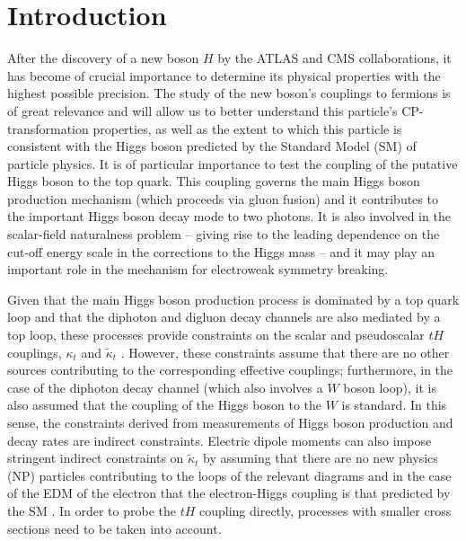 \documentclass[aps,preprint,tightenlines,floatfix,superscriptaddress,nofootinbib,showpacs]{revtex4-1}
\def\kp{\kappa_t}
\def\kpt{\tilde{\kappa}_t}
\begin{document}
\section{Introduction}
\label{sec1}
After the discovery of a new boson $H$ by the ATLAS \cite{atlasH} and
CMS \cite{cmsH} collaborations, it has become of crucial importance
 to determine its physical
 properties with the highest possible precision.
 The study of the new boson's couplings
 to fermions is of great relevance
 and will allow us to better understand this particle's $\mathrm{CP}$-transformation
   properties, as well as the
extent to which this particle is consistent with the Higgs boson
predicted by the Standard Model (SM) of particle physics.
It is of particular importance to test the coupling of the putative 
Higgs boson to
the top quark.  This coupling governs
the main Higgs boson production mechanism (which proceeds via gluon fusion)
and it contributes to the
important Higgs boson decay mode to two photons.
It is also
involved in the scalar-field naturalness problem -- giving rise to the
leading dependence on the cut-off energy scale in the corrections to
the Higgs mass -- and it may play an important role in the mechanism for electroweak symmetry breaking.\par

Given that the main Higgs boson production
process is dominated by a top quark loop and that
the diphoton and digluon decay channels are also mediated by a top
loop, these processes provide constraints on the scalar and
pseudoscalar $tH$ couplings, $\kp$ and $\kpt$
\cite{constraints1,constraints2, constraints3,constraints4}.
     However,
these constraints assume that there are no other sources contributing
to the corresponding effective couplings; furthermore, in the case of the
diphoton decay channel (which also involves a $W$ boson loop), it is also
assumed that the
coupling of the Higgs boson to the $W$ is standard. In this sense, the
constraints derived from measurements of Higgs boson production and decay rates
 are indirect constraints. Electric dipole moments can also
impose stringent indirect constraints on $\kpt$ by assuming that there
are no new physics (NP) particles contributing to the loops of the
relevant diagrams and in the case of the EDM of the electron that the 
electron-Higgs coupling is that
predicted by the SM \cite{constraints1,edm}. In order to probe
the $tH$ coupling directly, processes with smaller cross sections need
to be taken into account.  \par
\end{document}
